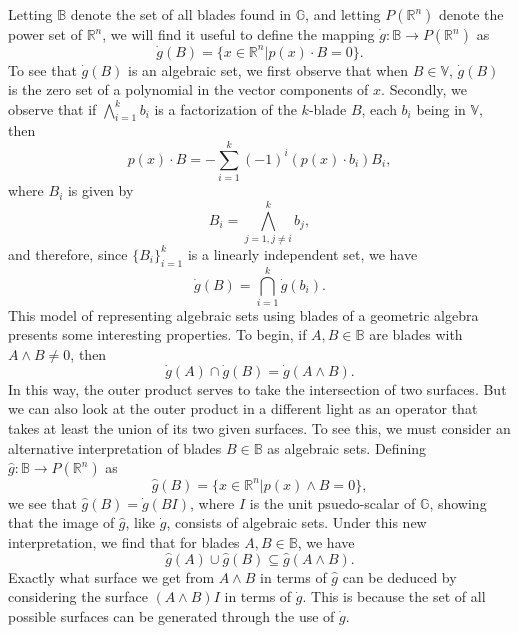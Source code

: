 \documentclass{ecgd-l}
\theoremstyle{definition}
\theoremstyle{remark}
\numberwithin{equation}{section}
\newcommand{\R}{\mathbb{R}}
\newcommand{\B}{\mathbb{B}}
\newcommand{\G}{\mathbb{G}}
\newcommand{\V}{\mathbb{V}}
\newcommand{\gd}{\dot{g}}
\newcommand{\gh}{\hat{g}}
\begin{document}
Letting $\B$ denote the set of all blades found in $\G$,
and letting $P(\R^n)$ denote the power set of $\R^n$,
we will find it useful to define the mapping $\gd:\B\to P(\R^n)$ as
\begin{equation}\label{equ_gd}
\gd(B) = \{x\in\R^n|p(x)\cdot B=0\}.
\end{equation}
To see that $\gd(B)$ is an algebraic set, we first observe that when $B\in\V$,
$\gd(B)$ is the zero set of a polynomial in the vector components of $x$.
Secondly, we observe that if $\bigwedge_{i=1}^k b_i$ is a factorization
of the $k$-blade $B$, each $b_i$ being in $\V$, then
\begin{equation}\label{equ_expand_p_dot_B}
p(x)\cdot B = -\sum_{i=1}^k (-1)^i (p(x)\cdot b_i)B_i,
\end{equation}
where $B_i$ is given by
\begin{equation*}
B_i = \bigwedge_{j=1,j\neq i}^k b_j,
\end{equation*}
and therefore, since $\{B_i\}_{i=1}^k$ is a linearly independent set, we have
\begin{equation*}
\gd(B) = \bigcap_{i=1}^k \gd(b_i).
\end{equation*}
This model of representing algebraic sets using blades of a geometric algebra presents
some interesting properties.  To begin, if $A,B\in\B$ are blades with $A\wedge B\neq 0$,
then
\begin{equation*}
\gd(A)\cap\gd(B)=\gd(A\wedge B).
\end{equation*}
In this way, the outer product serves to take the intersection of two surfaces.  But we can also
look at the outer product in a different light as an operator that takes at least the union
of its two given surfaces.  To see this, we must consider an alternative interpretation
of blades $B\in\B$ as algebraic sets.  Defining $\gh:\B\to P(\R^n)$ as
\begin{equation}\label{equ_gh}
\gh(B)=\{x\in\R^n|p(x)\wedge B=0\},
\end{equation}
we see that $\gh(B)=\gd(BI)$, where $I$ is the unit psuedo-scalar of $\G$, showing
that the image of $\gh$, like $\gd$, consists of algebraic sets.
Under this new interpretation, we find that for blades $A,B\in\B$, we have
\begin{equation*}
\gh(A)\cup\gh(B)\subseteq\gh(A\wedge B).
\end{equation*}
Exactly what surface we get from $A\wedge B$ in terms of $\gh$ can
be deduced by considering the surface $(A\wedge B)I$ in terms of $\gd$.
This is because the set of all possible surfaces can be generated through the
use of $\gd$.
\end{document}
